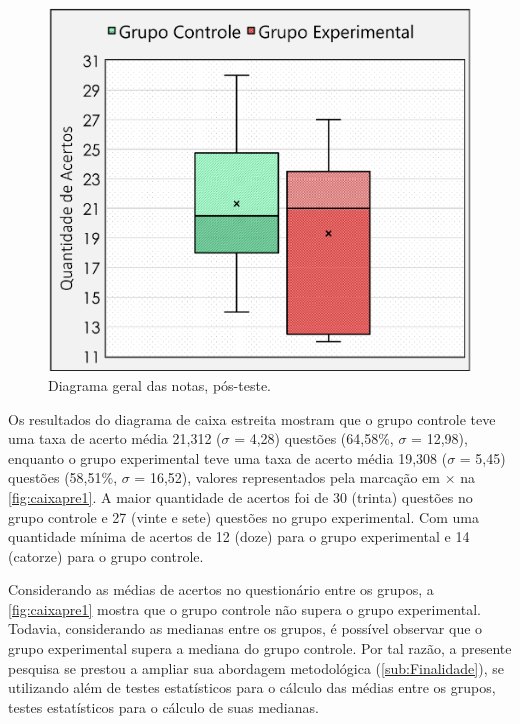 \begin{figure}%
    \vspace{-4pt}
    \caption{\label{fig:caixapre1}Diagrama geral das notas, pós-teste.}
    \includegraphics[width=\linewidth]{./Visuais/CaixaEstreitaPOS.pdf}
\end{figure}

Os resultados do diagrama de caixa estreita mostram que o grupo controle teve uma taxa de acerto média 21,312 ($\sigma$ = 4,28) questões (64,58\%, $\sigma$ = 12,98), enquanto o grupo experimental teve uma taxa de acerto média 19,308 ($\sigma$ = 5,45) questões (58,51\%, $\sigma$ = 16,52), valores representados pela marcação em $\times$ na \autoref{fig:caixapre1}. A maior quantidade de acertos foi de 30 (trinta) questões no grupo controle e 27 (vinte e sete) questões no grupo experimental. Com uma quantidade mínima de acertos de 12 (doze) para o grupo experimental e 14 (catorze) para o grupo controle.

Considerando as médias de acertos no questionário entre os grupos, a \autoref{fig:caixapre1} mostra que o grupo controle não supera o grupo experimental. Todavia, considerando as medianas entre os grupos, é possível observar que o grupo experimental supera a mediana do grupo controle. Por tal razão, a presente pesquisa se prestou a ampliar sua abordagem metodológica (\autoref{sub:Finalidade}), se utilizando além de testes estatísticos para o cálculo das médias entre os grupos, testes estatísticos para o cálculo de suas medianas. 

